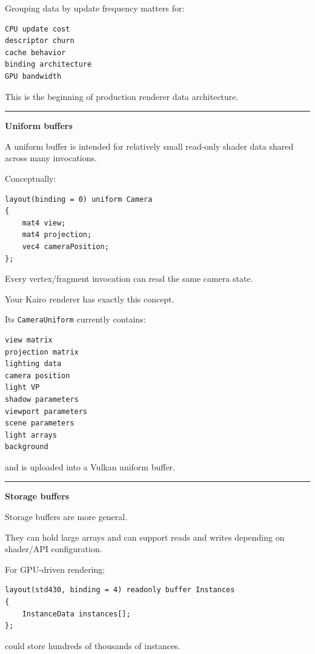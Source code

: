 Grouping data by update frequency matters for:

\begin{verbatim}
CPU update cost
descriptor churn
cache behavior
binding architecture
GPU bandwidth
\end{verbatim}

This is the beginning of production renderer data architecture.

\begin{center}\rule{0.5\linewidth}{0.5pt}\end{center}

\textbf{Uniform buffers}

A uniform buffer is intended for relatively small read-only shader data shared across many invocations.

Conceptually:

\begin{verbatim}
layout(binding = 0) uniform Camera
{
    mat4 view;
    mat4 projection;
    vec4 cameraPosition;
};
\end{verbatim}

Every vertex/fragment invocation can read the same camera state.

Your Kairo renderer has exactly this concept.

Its \texttt{CameraUniform} currently contains:

\begin{verbatim}
view matrix
projection matrix
lighting data
camera position
light VP
shadow parameters
viewport parameters
scene parameters
light arrays
background
\end{verbatim}

and is uploaded into a Vulkan uniform buffer.

\begin{center}\rule{0.5\linewidth}{0.5pt}\end{center}

\textbf{Storage buffers}

Storage buffers are more general.

They can hold large arrays and can support reads and writes depending on shader/API configuration.

For GPU-driven rendering:

\begin{verbatim}
layout(std430, binding = 4) readonly buffer Instances
{
    InstanceData instances[];
};
\end{verbatim}

could store hundreds of thousands of instances.

